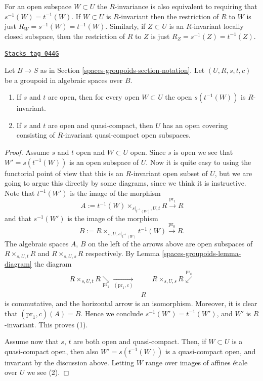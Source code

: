 For an open subspace $W \subset U$ the $R$-invariance
is also equivalent to requiring that $s^{-1}(W) = t^{-1}(W)$.
If $W \subset U$ is $R$-invariant then the restriction of $R$ to
$W$ is just $R_W = s^{-1}(W) = t^{-1}(W)$. Similarly, if $Z \subset U$
is an $R$-invariant locally closed subspace, then the restriction of $R$
to $Z$ is just $R_Z = s^{-1}(Z) = t^{-1}(Z)$.

\begin{lemma}
\label{spaces-groupoids-lemma-constructing-invariant-opens}
\href{https://stacks.math.columbia.edu/tag/044G}{\texttt{Stacks tag 044G}}

Let $B \to S$ as in Section \ref{spaces-groupoids-section-notation}.
Let $(U, R, s, t, c)$ be a groupoid in algebraic spaces over $B$.
\begin{enumerate}
\item If $s$ and $t$ are open, then for every open $W \subset U$
the open $s(t^{-1}(W))$ is $R$-invariant.
\item If $s$ and $t$ are open and quasi-compact, then $U$ has an open
covering consisting of $R$-invariant quasi-compact open subspaces.
\end{enumerate}
\end{lemma}

\begin{proof}
Assume $s$ and $t$ open and $W \subset U$ open.
Since $s$ is open we see that $W' = s(t^{-1}(W))$ is an open subspace of $U$.
Now it is quite easy to using the functorial point of view
that this is an $R$-invariant open subset of $U$, but we are going to argue
this directly by some diagrams, since we think it is instructive.
Note that $t^{-1}(W')$ is the image of the morphism
$$
A := t^{-1}(W) \times_{s|_{t^{-1}(W)}, U, t} R
\xrightarrow{\text{pr}_1} R
$$
and that $s^{-1}(W')$ is the image of the morphism
$$
B := R \times_{s, U, s|_{t^{-1}(W)}} t^{-1}(W)
\xrightarrow{\text{pr}_0} R.
$$
The algebraic spaces $A$, $B$
on the left of the arrows above are open subspaces of
$R \times_{s, U, t} R$ and $R \times_{s, U, s} R$ respectively.
By Lemma \ref{spaces-groupoids-lemma-diagram} the diagram
$$
\begin{array}{ccc}R \times_{s, U, t} R \underset{\text{pr}_1}{\searrow}\underset{(\text{pr}_1, c)}{\longrightarrow} &  & R \times_{s, U, s} R \overset{\text{pr}_0}{\swarrow} \\  & R & \end{array}
$$
is commutative, and the horizontal arrow is an isomorphism. Moreover, it is
clear that $(\text{pr}_1, c)(A) = B$. Hence we conclude
$s^{-1}(W') = t^{-1}(W')$, and $W'$ is $R$-invariant. This proves (1).

\medskip\noindent
Assume now that $s$, $t$ are both open and quasi-compact.
Then, if $W \subset U$ is a quasi-compact open, then also
$W' = s(t^{-1}(W))$ is a quasi-compact open, and invariant by the
discussion above. Letting $W$ range over images of affines \'etale over $U$
we see (2).
\end{proof}

